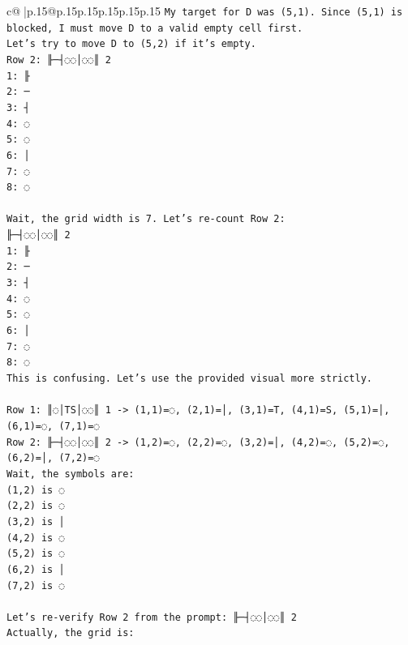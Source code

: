 \documentclass{article}
\begin{document}
{\begin{supertabular}{c@{$\;$}|p{.15\linewidth}@{}p{.15\linewidth}p{.15\linewidth}p{.15\linewidth}p{.15\linewidth}p{.15\linewidth}}
{{{\texttt{My target for D was (5,1). Since (5,1) is blocked, I must move D to a valid empty cell first.} \\
\texttt{Let's try to move D to (5,2) if it's empty.} \\
\texttt{Row 2: ╟─┤◌◌│◌◌║ 2} \\
\texttt{1: ╟} \\
\texttt{2: ─} \\
\texttt{3: ┤} \\
\texttt{4: ◌} \\
\texttt{5: ◌} \\
\texttt{6: │} \\
\texttt{7: ◌} \\
\texttt{8: ◌} \\
\\ 
\texttt{Wait, the grid width is 7. Let's re{-}count Row 2:} \\
\texttt{╟─┤◌◌│◌◌║ 2} \\
\texttt{1: ╟} \\
\texttt{2: ─} \\
\texttt{3: ┤} \\
\texttt{4: ◌} \\
\texttt{5: ◌} \\
\texttt{6: │} \\
\texttt{7: ◌} \\
\texttt{8: ◌} \\
\texttt{This is confusing. Let's use the provided visual more strictly.} \\
\\ 
\texttt{Row 1: ║◌│TS│◌◌║ 1 {-}> (1,1)=◌, (2,1)=│, (3,1)=T, (4,1)=S, (5,1)=│, (6,1)=◌, (7,1)=◌} \\
\texttt{Row 2: ╟─┤◌◌│◌◌║ 2 {-}> (1,2)=◌, (2,2)=◌, (3,2)=│, (4,2)=◌, (5,2)=◌, (6,2)=│, (7,2)=◌} \\
\texttt{Wait, the symbols are:} \\
\texttt{(1,2) is ◌} \\
\texttt{(2,2) is ◌} \\
\texttt{(3,2) is │} \\
\texttt{(4,2) is ◌} \\
\texttt{(5,2) is ◌} \\
\texttt{(6,2) is │} \\
\texttt{(7,2) is ◌} \\
\\ 
\texttt{Let's re{-}verify Row 2 from the prompt: ╟─┤◌◌│◌◌║ 2} \\
\texttt{Actually, the grid is:} \\
}}}
\end{supertabular}}
\end{document}
